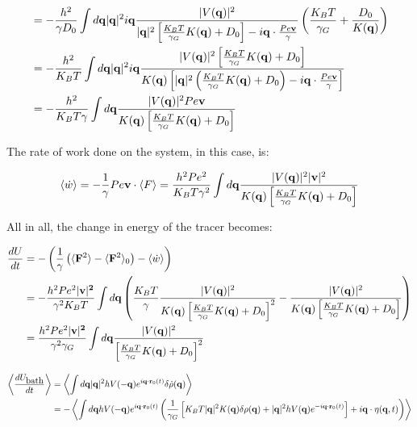 \documentclass[amsmath,preprintnumbers,10pt,article,notitlepage]{revtex4-1}
\begin{document}
\begin{align}
& = - \dfrac{h^2}{\gamma D_0}  \int d{\bf q} |{\bf q}|^2  i{\bf q} \dfrac{|V({\bf q})|^2}{|{\bf q}|^2 \left[\frac{K_BT}{\gamma_G} K({\bf q}) + D_0 \right] - i{\bf q} \cdot  \frac{Pe{\bf v}}{\gamma}} \left( \dfrac{K_BT}{\gamma_G} + \dfrac{D_0}{K({\bf q})} \right) \\
& = - \dfrac{h^2}{K_BT} \int d{\bf q} |{\bf q}|^2 i{\bf q} \dfrac{|V({\bf q})|^2 \left[\frac{K_BT}{\gamma_G} K({\bf q}) + D_0 \right]}{K({\bf q}) \left[ |{\bf q}|^2 \left( \frac{K_BT}{\gamma_G} K({\bf q}) + D_0 \right) - i{\bf q} \cdot  \frac{Pe{\bf v}}{\gamma} \right]} \\
& =  - \dfrac{h^2}{K_BT \gamma} \int d{\bf q} \dfrac{|V({\bf q})|^2 Pe {\bf v}}{K({\bf q}) \left[ \frac{K_BT}{\gamma_G} K({\bf q}) + D_0 \right]} \\
\end{align}

The rate of work done on the system, in this case, is:

\begin{equation}
\langle \dot{w} \rangle = -\dfrac{1}{\gamma} Pe {\bf v} \cdot \langle F \rangle =  \dfrac{h^2 Pe^2}{K_BT \gamma^2} \int d{\bf q} \dfrac{|V({\bf q})|^2  |{\bf v}|^2}{K({\bf q}) \left[ \frac{K_BT}{\gamma_G} K({\bf q}) + D_0 \right]}
\label{eq:RateOfWork}
\end{equation}

All in all, the change in energy of the tracer becomes:

\begin{align}
\dfrac{dU}{dt} & = -\left( \dfrac{1}{\gamma} \left( \langle {\bf F} ^2 \rangle - \langle {\bf F} ^2 \rangle_0 \right) - \langle \dot{w} \rangle \right) \\
& = -\dfrac{h^2Pe^2 |\bf v|^2}{\gamma^2 K_BT} \int d{\bf q} \left( \dfrac{K_BT}{\gamma} \dfrac{|V({\bf q})|^2}{K({\bf q}) \left[\frac{K_BT}{\gamma_G} K({\bf q}) + D_0 \right]^2} - \dfrac{|V({\bf q})|^2}{K({\bf q}) \left[\frac{K_BT}{\gamma_G} K({\bf q}) + D_0 \right]}  \right) \\
& =  \dfrac{h^2 Pe^2 |\bf v|^2}{\gamma^2 \gamma_G} \int d{\bf q} \dfrac{|V({\bf q})|^2}{\left[\frac{K_BT}{\gamma_G} K({\bf q}) + D_0 \right]^2}  
\label{eq:dutracer}
\end{align}


\begin{align}
\left \langle \dfrac{dU_{\mbox{bath}}}{dt}  \right \rangle & = \left \langle \int d {\bf q} |{\bf q}|^2 h V(-{\bf q}) e^{i{\bf q} \cdot {\bf r}_0(t)} \delta \dot{\rho}({\bf q}) \right \rangle \\
& = - \left \langle \int d {\bf q} h V(-{\bf q}) e^{i{\bf q} \cdot {\bf r}_0(t)} \left( \dfrac{1}{\gamma_G}\left[ K_BT |{\bf q}|^2 K({\bf q}) \delta \rho({\bf q}) +  |{\bf q}|^2 h V({\bf q}) e^{-i {\bf q} \cdot {\bf r}_0(t)} \right] + i{\bf q} \cdot \eta({\bf q},t) \right)  \right \rangle
\end{align}
\end{document}
